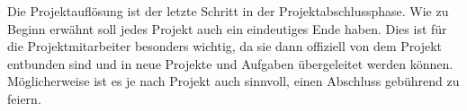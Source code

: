 Die Projektauflösung ist der letzte Schritt in der Projektabschlussphase. Wie 
zu Beginn erwähnt soll jedes Projekt auch ein eindeutiges Ende haben. Dies ist
für die Projektmitarbeiter besonders wichtig, da sie dann offiziell von dem
Projekt entbunden sind und in neue Projekte und Aufgaben übergeleitet werden
können. Möglicherweise ist es je nach Projekt auch sinnvoll, einen Abschluss
gebührend zu feiern.